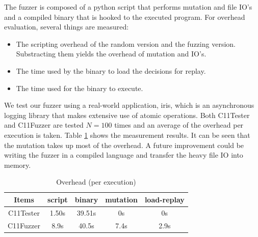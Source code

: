 The fuzzer is composed of a python script that performs mutation and file IO's and a compiled binary that is hooked to the executed program. For overhead evaluation, several things are measured:
\begin{itemize}
	\item The scripting overhead of the random version and the fuzzing version. Substracting them yields the overhead of mutation and IO's.
	\item The time used by the binary to load the decisions for replay.
	\item The time used for the binary to execute.
\end{itemize}

We test our fuzzer using a real-world application, iris, which is an asynchronous logging library that makes extensive use of atomic operations. Both C11Tester and C11Fuzzer are tested $N=100$ times and an average of the overhead per execution is taken. Table \ref{overhead} shows the measurement results. It can be seen that the mutation takes up most of the overhead. A future improvement could be writing the fuzzer in a compiled language and transfer the heavy file IO into memory.

\begin{table}[h!]
	\centering
	\begin{tabular}{ |c|cccc| }
		\hline
		Items     & script & binary & mutation & load-replay \\
		\hline
		C11Tester & 1.50s  & 39.51s & 0s       & 0s          \\
		C11Fuzzer & 8.9s   & 40.5s  & 7.4s     & 2.9s        \\
		\hline
	\end{tabular}
	\caption{Overhead (per execution)}
	\label{overhead}
\end{table}


